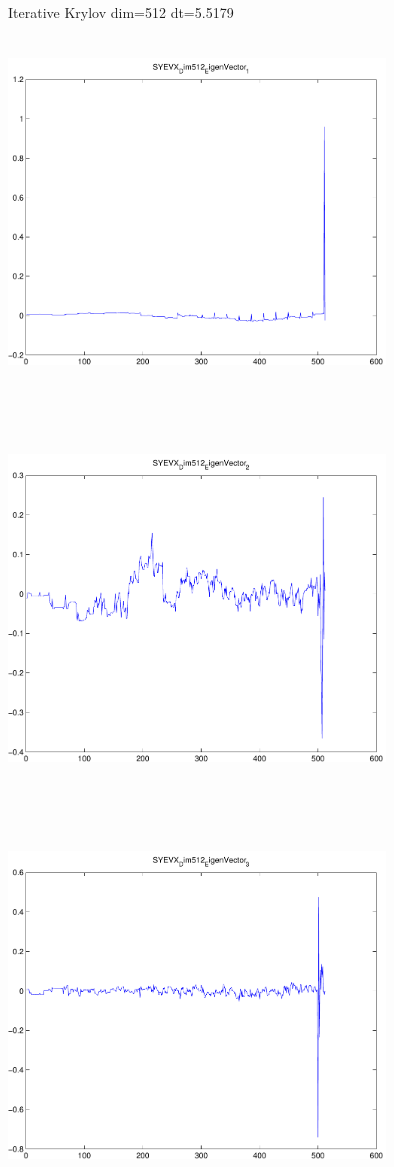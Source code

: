 \documentclass[9pt]{article}
\theoremstyle{plain}
\theoremstyle{definition}
\theoremstyle{remark}
\numberwithin{equation}{section}
\begin{document}
Iterative Krylov dim=512 dt=5.5179
\includegraphics[width=10.0cm,height=10.0cm]{SYEVX_Dim512_EigenVector_1.pdf}

\includegraphics[width=10.0cm,height=10.0cm]{SYEVX_Dim512_EigenVector_2.pdf}

\includegraphics[width=10.0cm,height=10.0cm]{SYEVX_Dim512_EigenVector_3.pdf}
\end{document}
